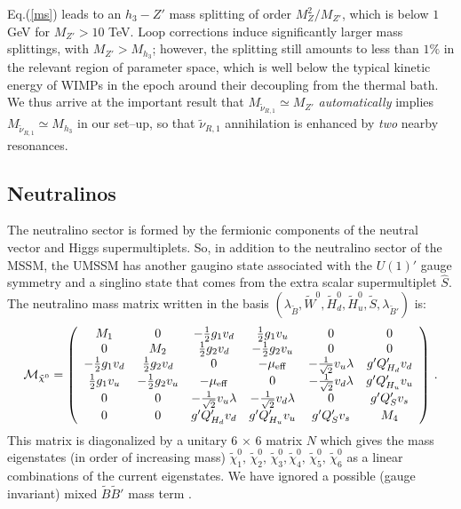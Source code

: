 \documentclass[a4paper,11pt]{article}
\begin{document}
Eq.(\ref{ms}) leads to an $h_3 - Z'$ mass splitting of order
$M^2_Z/M_{Z'}$, which is below $1$ GeV for $M_{Z'} > 10$ TeV. Loop
corrections induce significantly larger mass splittings, with
$M_{Z'} > M_{h_3}$; however, the splitting still amounts to less than
$1\%$ in the relevant region of parameter space, which is well below
the typical kinetic energy of WIMPs in the epoch around their
decoupling from the thermal bath. We thus arrive at the important
result that $M_{\tilde \nu_{R,1}} \simeq M_{Z'}$ {\em automatically}
implies $M_{\tilde \nu_{R,1}} \simeq M_{h_3}$ in our set--up, so that
$\tilde \nu_{R,1}$ annihilation is enhanced by {\em two} nearby
resonances.


\subsection{Neutralinos}
\label{section2.5}

The neutralino sector is formed by the fermionic components of the
neutral vector and Higgs
supermultiplets. So, in addition to the neutralino sector of the MSSM,
the UMSSM has another gaugino state associated with the $U(1)'$
gauge symmetry and a singlino state that comes from the extra
scalar supermultiplet $\hat{S}$. The neutralino mass matrix written in
the basis
$\left(\lambda_{\tilde{B}}, \tilde{W}^0, \tilde{H}_d^0, \tilde{H}_u^0,
  \tilde{S}, \lambda_{\tilde{B}'}\right)$ is:
%
\begin{equation}  \label{eq 2.21}
\mathcal{M}_{\tilde{\chi}^0} = \left( 
\begin{array}{cccccc}
M_1 &0 &-\frac{1}{2} g_1 v_d  &\frac{1}{2} g_1 v_u  &0 &0\\ 
0 &M_2 &\frac{1}{2} g_2 v_d  &-\frac{1}{2} g_2 v_u  &0 &0\\ 
-\frac{1}{2} g_1 v_d  &\frac{1}{2} g_2 v_d  &0 &- \mu_{\rm eff}  &
- \frac{1}{\sqrt{2}} v_u \lambda  &g' Q'_{H_d} v_d \\ 
\frac{1}{2} g_1 v_u  &-\frac{1}{2} g_2 v_u  &- \mu_{\rm eff}  &0 &
- \frac{1}{\sqrt{2}} v_d \lambda  &g' Q'_{H_u} v_u \\ 
0 &0 &- \frac{1}{\sqrt{2}} v_u \lambda  &- \frac{1}{\sqrt{2}} v_d \lambda  
&0 &g' Q'_{S} v_s \\ 
0 &0 &g' Q'_{H_d} v_d  &g' Q'_{H_u} v_u  &g' Q'_{S} v_s  &M_4\end{array} 
\right)\,.   
\end{equation} 
%
This matrix is diagonalized by a unitary 6 $\times$ 6 matrix $N$ which
gives the mass eigenstates (in order of increasing mass)
$\tilde{\chi}^0_1, \, \tilde{\chi}^0_2, \, \tilde{\chi}^0_3,
\tilde{\chi}^0_4,\, \tilde{\chi}^0_5,\, \tilde{\chi}^0_6$
as a linear combinations of the current eigenstates. We have ignored a
possible (gauge invariant) mixed $\tilde B \tilde B'$ mass term
\cite{Suematsu:1997qt, Suematsu:1997au}.
\end{document}
